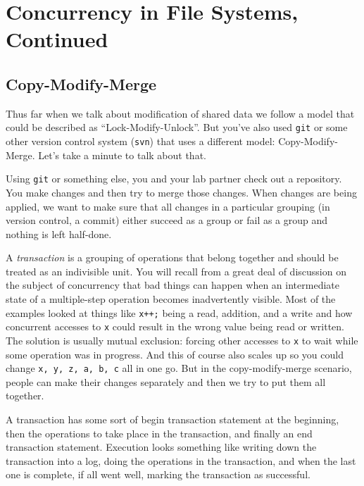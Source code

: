 




\section*{Concurrency in File Systems, Continued}


\subsection*{Copy-Modify-Merge}
Thus far when we talk about modification of shared data we follow a model that could be described as ``Lock-Modify-Unlock''. But you've also used \texttt{git} or some other version control system (\texttt{svn}) that uses a different model: Copy-Modify-Merge. Let's take a minute to talk about that.

Using \texttt{git} or something else, you and your lab partner check out a repository. You make changes and then try to merge those changes. When changes are being applied, we want to make sure that all changes in a particular grouping (in version control, a commit) either succeed as a group or fail as a group and nothing is left half-done.

A \textit{transaction} is a grouping of operations that belong together and should be treated as an indivisible unit. You will recall from a great deal of discussion on the subject of concurrency that bad things can happen when an intermediate state of a multiple-step operation becomes inadvertently visible. Most of the examples looked at things like \texttt{x++;} being a read, addition, and a write and how concurrent accesses to \texttt{x} could result in the wrong value being read or written. The solution is usually mutual exclusion: forcing other accesses to \texttt{x} to wait while some operation was in progress. And this of course also scales up so you could change \texttt{x, y, z, a, b, c} all in one go. But in the copy-modify-merge scenario, people can make their changes separately and then we try to put them all together.

A transaction has some sort of begin transaction statement at the beginning, then the operations to take place in the transaction, and finally an end transaction statement. Execution looks something like writing down the transaction into a log, doing the operations in the transaction, and when the last one is complete, if all went well, marking the transaction as successful.

